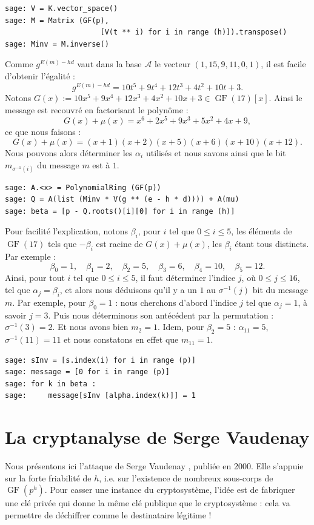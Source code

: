 \documentclass[a4paper, titlepage, 11pt]{article}
\theoremstyle{definition}
\theoremstyle{remark}
\def\gf{\operatorname{GF}}
\begin{document}
\begin{verbatim}
sage: V = K.vector_space()
sage: M = Matrix (GF(p), 
                      [V(t ** i) for i in range (h)]).transpose()
sage: Minv = M.inverse()
\end{verbatim}
Comme $g^{E(m) - hd}$ vaut dans la base $\mathcal{A}$ le vecteur $(1, 15, 9, 11, 0, 1)$, il est facile d'obtenir l'égalité : 
$$g^{E(m) - hd} = 10t^5 + 9t^4 + 12t^3 + 4t^2 + 10t + 3.$$
Notons $G(x) := 10x^5 + 9x^4 + 12x^3 + 4x^2 + 10x + 3 \in \gf(17)[x]$.
Ainsi le message est recouvré en factorisant le polynôme :
$$G(x) + \mu(x) = x^6 + 2x^5 + 9x^3 + 5x^2 + 4x + 9,$$
ce que nous faisons : 
$$G(x) + \mu(x) = (x + 1)(x + 2)(x + 5)(x + 6)(x + 10)(x + 12).$$ 
Nous pouvons alors déterminer les $\alpha_i$ utilisés et nous savons ainsi que le bit $m_{\sigma^{-1}(i)}$ du message $m$ est à $1$.
\begin{verbatim}
sage: A.<x> = PolynomialRing (GF(p))
sage: Q = A(list (Minv * V(g ** (e - h * d)))) + A(mu)
sage: beta = [p - Q.roots()[i][0] for i in range (h)]
\end{verbatim}
Pour facilité l'explication, notons $\beta_i$, pour $i$ tel que $0\leqslant i \leqslant 5$, les éléments de $\gf(17)$ tels que $-\beta_i$ est racine de $G(x) + \mu(x)$, les $\beta_i$ étant tous distincts. Par exemple : 
$$\beta_0 = 1,\quad \beta_1 =2,\quad \beta_2 = 5,\quad \beta_3 =6,\quad \beta_4 =10,\quad \beta_5 = 12.$$
Ainsi, pour tout $i$ tel que $0\leqslant i \leqslant 5$, il faut déterminer l'indice $j$, où $0 \leqslant j \leqslant 16$, tel que $\alpha_j = \beta_i$, et alors nous déduisons qu'il y a un $1$ au $\sigma^{-1}(j)$ bit du message $m$.
Par exemple, pour $\beta_0 = 1$ : nous cherchons d'abord l'indice $j$ tel que $\alpha_j = 1$, à savoir $j = 3$. Puis nous déterminons son antécédent par la permutation : $\sigma^{-1}(3) = 2$. Et nous avons bien $m_2 = 1$. Idem, pour $\beta_2 = 5$ : $\alpha_{11} = 5$, $\sigma^{-1}(11) = 11$ et nous constatons en effet que $m_{11} = 1$.
\begin{verbatim}
sage: sInv = [s.index(i) for i in range (p)]
sage: message = [0 for i in range (p)]
sage: for k in beta :
sage:     message[sInv [alpha.index(k)]] = 1
\end{verbatim}

\section{La cryptanalyse de Serge Vaudenay}\label{sec:cryptanalyse}

Nous présentons ici l'attaque de Serge Vaudenay \cite{vaudenay2000}, publiée en 2000. Elle s'appuie sur la forte friabilité de $h$, i.e. sur l'existence de nombreux sous-corps de $\gf(p^h)$. Pour casser une instance du cryptosystème, l'idée est de fabriquer une clé privée qui donne la même clé publique que le cryptosystème : cela va permettre de déchiffrer comme le destinataire légitime !
\end{document}

